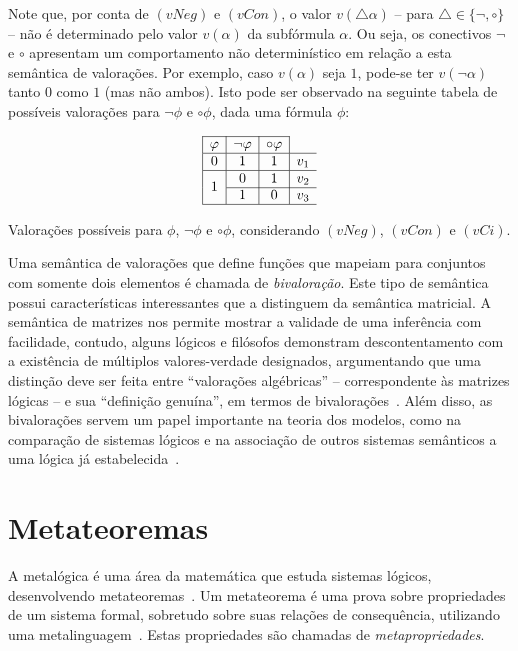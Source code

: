         Note que, por conta de $(vNeg)$ e $(vCon)$, o valor $v(\triangle \alpha)$ {--} para $\triangle \in \{\neg, \circ\}$ {--} não é determinado pelo valor $v(\alpha)$ da subfórmula $\alpha$. Ou seja, os conectivos $\neg$ e $\circ$ apresentam um comportamento não determinístico em relação a esta semântica de valorações. Por exemplo, caso $v(\alpha)$ seja $1$, pode-se ter $v(\neg \alpha)$ tanto $0$ como $1$ (mas não ambos). Isto pode ser observado na seguinte tabela de possíveis valorações para $\neg \phi$ e $\circ \phi$, dada uma fórmula $\phi$:

        \begin{table}[h]
            \[
                \begin{array}{|c|c|c|c}%
                    \cline{1-3}
                    \phi & \neg\phi & \circ\phi & \\ \hline%
                    0 & 1 & 1 & v_1 \\ \hline%
                    \multirow{2}{*}{1} & 0 & 1 & v_2 \\ \cline{2-4}
                    & 1 & 0 & v_3 \\ \hline%
                \end{array}
                \]
                \caption{Valorações possíveis para $\phi$, $\neg \phi$ e $\circ \phi$, considerando $(vNeg)$, $(vCon)$ e $(vCi)$.}\label{tab:negcirc}
        \end{table}

        Uma semântica de valorações que define funções que mapeiam para conjuntos com somente dois elementos é chamada de \textit{bivaloração}. Este tipo de semântica possui características interessantes que a distinguem da semântica matricial. A semântica de matrizes nos permite mostrar a validade de uma inferência com facilidade, contudo, alguns lógicos e filósofos demonstram descontentamento com a existência de múltiplos valores-verdade designados, argumentando que uma distinção deve ser feita entre ``valorações algébricas'' {--} correspondente às matrizes lógicas {--} e sua ``definição genuína'', em termos de bivalorações~\cite{Suszko1975-SUSROL}. Além disso, as bivalorações servem um papel importante na teoria dos modelos, como na comparação de sistemas lógicos e na associação de outros sistemas semânticos a uma lógica já estabelecida~\cite{bivalence}.

        
                
\section{Metateoremas}\label{sec:metateoremas}
    A metalógica é uma área da matemática que estuda sistemas lógicos, desenvolvendo metateoremas~\cite{Jacquette2002-JACACT-7}. Um metateorema é uma prova sobre propriedades de um sistema formal, sobretudo sobre suas relações de consequência, utilizando uma metalinguagem~\cite{Tarski1956-TARLSM, Rasiowa1963-RASTMO, Barile_2024}. Estas propriedades são chamadas de \textit{metapropriedades}. 
    
